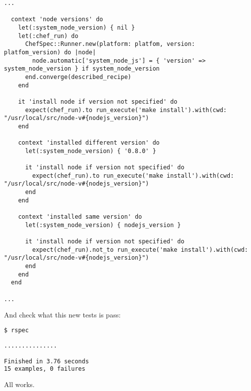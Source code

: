 \begin{lstlisting}[label=lst:testing-fauxhai2,title=my-server-cloud/site-cookbooks/my\_cool\_app/spec/unit/recipes/node\_spec.rb]
...

  context 'node versions' do
    let(:system_node_version) { nil }
    let(:chef_run) do
      ChefSpec::Runner.new(platform: platfom, version: platfom_version) do |node|
        node.automatic['system_node_js'] = { 'version' => system_node_version } if system_node_version
      end.converge(described_recipe)
    end

    it 'install node if version not specified' do
      expect(chef_run).to run_execute('make install').with(cwd: "/usr/local/src/node-v#{nodejs_version}")
    end

    context 'installed different version' do
      let(:system_node_version) { '0.8.0' }

      it 'install node if version not specified' do
        expect(chef_run).to run_execute('make install').with(cwd: "/usr/local/src/node-v#{nodejs_version}")
      end
    end

    context 'installed same version' do
      let(:system_node_version) { nodejs_version }

      it 'install node if version not specified' do
        expect(chef_run).not_to run_execute('make install').with(cwd: "/usr/local/src/node-v#{nodejs_version}")
      end
    end
  end

...
\end{lstlisting}

And check what this new tests is pass:

\begin{lstlisting}[language=Bash,label=lst:testing-fauxhai2]
$ rspec

...............

Finished in 3.76 seconds
15 examples, 0 failures
\end{lstlisting}

All works.